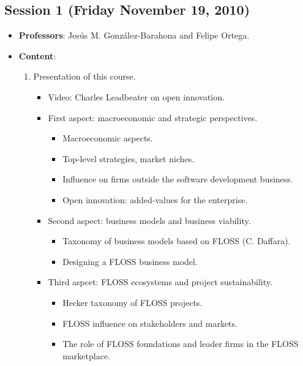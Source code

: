\documentclass[a4paper]{article}
\begin{document}
\subsection{Session 1 (Friday November 19, 2010)}

\begin{itemize}
 \item \textbf{Professors}: Jesús M. González-Barahona and Felipe Ortega.

 \item \textbf{Content}:

    \begin{enumerate}
     \item Presentation of this course.
	\begin{itemize}
	 \item Video: Charles Leadbeater on open innovation.
	 \item First aspect: macroeconomic and strategic perspectives.
	  \begin{itemize}
	   \item Macroeconomic aspects.
	   \item Top-level strategies, market niches.
	   \item Influence on firms outside the software development business.
	   \item Open innovation: added-values for the enterprise.
	  \end{itemize}

	 \item Second aspect: business models and business viability.
	   \begin{itemize}
	    \item Taxonomy of business models based on FLOSS (C. Daffara).
	    \item Designing a FLOSS business model.
	   \end{itemize}

	 \item Third aspcet: FLOSS ecosystems and project sustainability.
	    \begin{itemize}
	     \item Hecker taxonomy of FLOSS projects.
	     \item FLOSS influence on stakeholders and markets.
	     \item The role of FLOSS foundations and leader firms in the FLOSS marketplace.
	    \end{itemize}

	\end{itemize}


\end{enumerate}
\end{itemize}
\end{document}
